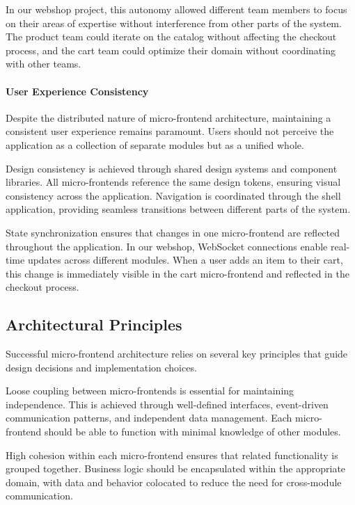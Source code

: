 \documentclass[12pt,a4paper]{report}
\begin{document}
In our webshop project, this autonomy allowed different team members to focus on their areas of expertise without interference from other parts of the system. The product team could iterate on the catalog without affecting the checkout process, and the cart team could optimize their domain without coordinating with other teams.

\paragraph{User Experience Consistency}

Despite the distributed nature of micro-frontend architecture, maintaining a consistent user experience remains paramount. Users should not perceive the application as a collection of separate modules but as a unified whole.

Design consistency is achieved through shared design systems and component libraries. All micro-frontends reference the same design tokens, ensuring visual consistency across the application. Navigation is coordinated through the shell application, providing seamless transitions between different parts of the system.

State synchronization ensures that changes in one micro-frontend are reflected throughout the application. In our webshop, WebSocket connections enable real-time updates across different modules. When a user adds an item to their cart, this change is immediately visible in the cart micro-frontend and reflected in the checkout process.

\subsection*{Architectural Principles}

Successful micro-frontend architecture relies on several key principles that guide design decisions and implementation choices.

Loose coupling between micro-frontends is essential for maintaining independence. This is achieved through well-defined interfaces, event-driven communication patterns, and independent data management. Each micro-frontend should be able to function with minimal knowledge of other modules.

High cohesion within each micro-frontend ensures that related functionality is grouped together. Business logic should be encapsulated within the appropriate domain, with data and behavior colocated to reduce the need for cross-module communication.
\end{document}
